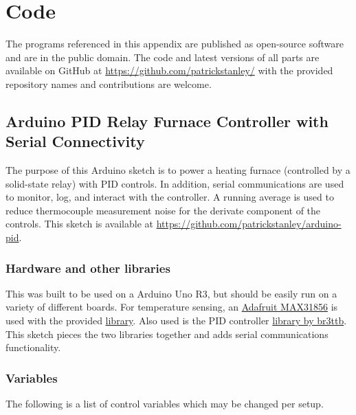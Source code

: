 

\chapter{Code}
    The programs referenced in this appendix are published as open-source software and are in the public domain.
    The code and latest versions of all parts are available on GitHub at \href{https://github.com/patrickstanley}{https://github.com/patrickstanley/} with the provided repository names and contributions are welcome.

\section{Arduino PID Relay Furnace Controller with Serial Connectivity}
    \label{app:PID}

    The purpose of this Arduino sketch is to power a heating furnace
    (controlled by a solid-state relay) with PID controls.
    In addition, serial communications are used to monitor, log, and interact with the controller.
    A running average is used to reduce thermocouple measurement noise for the derivate component of the controls.
    This sketch is available at \href{https://github.com/patrickstanley/arduino-pid}{https://github.com/patrickstanley/arduino-pid}.

    \subsection{Hardware and other libraries}
        This was built to be used on a Arduino Uno R3, but should be easily run on a variety of different boards.
        For temperature sensing, an \href{https://www.adafruit.com/product/3263}{Adafruit MAX31856} is used with the provided \href{https://github.com/adafruit/Adafruit_MAX31856}{library}.
        Also used is the PID controller \href{https://github.com/br3ttb/Arduino-PID-Library}{library by br3ttb}.
        This sketch pieces the two libraries together and adds serial communications functionality.

    \subsection{Variables}
        The following is a list of control variables which may be changed per setup.

